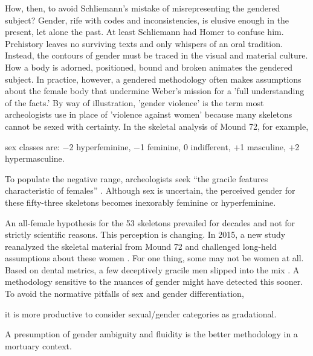 How, then, to avoid Schliemann's mistake of misrepresenting the gendered subject? Gender, rife with codes and inconsistencies, is elusive enough in the present, let alone the past. At least Schliemann had Homer to confuse him. Prehistory leaves no surviving texts and only whispers of an oral tradition. Instead, the contours of gender must be traced in the visual and material culture. How a body is adorned, positioned, bound and broken animates the gendered subject. In practice, however, a gendered methodology often makes assumptions about the female body that undermine Weber's mission for a 'full understanding of the facts.' By way of illustration, 'gender violence' is the term most archeologists use in place of 'violence against women' because many skeletons cannot be sexed with certainty. In the skeletal analysis of Mound 72, for example, \begin{IJSRAquote}{\cite[63]{fowler1999}}sex classes are: \num{-2} hyperfeminine, \num{-1} feminine, \num{0} indifferent, +1 masculine, +2 hypermasculine.\end{IJSRAquote} To populate the negative range, archeologists seek \enquote{the gracile features characteristic of females} \parencite[54]{fowler1999}. Although sex is uncertain, the perceived gender for these fifty-three skeletons becomes inexorably feminine or hyperfeminine. 


An all-female hypothesis for the 53 skeletons prevailed for decades and not for strictly scientific reasons. This perception is changing. In 2015, a new study reanalyzed the skeletal material from Mound 72 and challenged long-held assumptions about these women \parencite[]{slater2014}. For one thing, some may not be women at all. Based on dental metrics, a few deceptively gracile men slipped into the mix \parencite[]{thompson2013}. A methodology sensitive to the nuances of gender might have detected this sooner. To avoid the normative pitfalls of sex and gender differentiation, \begin{IJSRAquote}{\cite[3]{rautman2000}}it is more productive to consider sexual/gender categories as gradational.\end{IJSRAquote} A presumption of gender ambiguity and fluidity is the better methodology in a mortuary context. 

